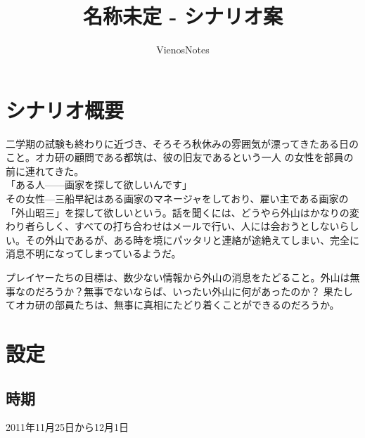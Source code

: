 \documentclass[a4paper,8pt,min]{jsarticle}
\title{名称未定 - シナリオ案}
\author{VienosNotes}
\begin{document}
\maketitle
\newpage
\section{シナリオ概要}
二学期の試験も終わりに近づき、そろそろ秋休みの雰囲気が漂ってきたある日の
こと。オカ研の顧問である都筑は、彼の旧友であるという一人
の女性を部員の前に連れてきた。\\


「ある人------画家を探して欲しいんです」\\


その女性---三船早紀はある画家のマネージャをしており、雇い主である画家の
「外山昭三」を探して欲しいという。話を聞くには、どうやら外山はかなりの変
わり者らしく、すべての打ち合わせはメールで行い、人には会おうとしないらし
い。その外山であるが、ある時を境にパッタリと連絡が途絶えてしまい、完全に
消息不明になってしまっているようだ。

プレイヤーたちの目標は、数少ない情報から外山の消息をたどること。外山は無
事なのだろうか？無事でないならば、いったい外山に何があったのか？
果たしてオカ研の部員たちは、無事に真相にたどり着くことができるのだろうか。







\section{設定}
\subsection{時期}
2011年11月25日から12月1日
\end{document}
